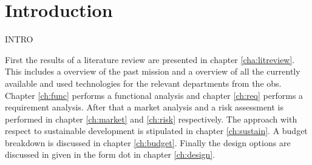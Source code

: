 \section{Introduction}\label{cha:introduction}

INTRO

First the results of a literature review are presented in chapter \ref{cha:litreview}. This includes a overview of the past mission and a overview of all the currently available and used technologies for the relevant departments from the \gls{obs}. Chapter \ref{ch:func} performs a functional analysis and chapter \ref{ch:req} performs a requirement analysis. After that a market analysis and a risk assessment is performed in chapter \ref{ch:market} and \ref{ch:risk} respectively. The approach with respect to sustainable development is stipulated in chapter \ref{ch:sustain}. A budget breakdown is discussed in chapter \ref{ch:budget}. Finally the design options are discussed in given in the form \gls{dot} in chapter \ref{ch:design}. 



